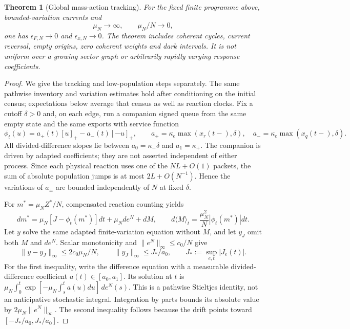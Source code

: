 \documentclass[11pt,oneside,openany]{book}
\newtheorem{theorem}{Theorem}[chapter]
\theoremstyle{definition}
\theoremstyle{remark}\newtheorem{remark}[theorem]{Remark}
\begin{document}
\begin{theorem}[Global mass-action tracking]\label{kin:tracking}
For the fixed finite programme above, bounded-variation currents and
\begin{equation}
 \mu_N\longrightarrow\infty,\qquad \mu_N/N\longrightarrow0,
 \label{kin:hierarchy}
\end{equation}
one has $\epsilon_{F,N}\to0$ and $\epsilon_{x,N}\to0$.
The theorem includes coherent cycles, current reversal, empty origins,
zero coherent weights and dark intervals. It is not uniform over a growing
sector graph or arbitrarily rapidly varying response coefficients.
\end{theorem}
\begin{proof}
We give the tracking and low-population steps separately. The same pathwise inventory and variation estimates hold after conditioning on the initial census; expectations below average that census as well as reaction clocks. Fix a cutoff
$\delta>0$ and, on each edge, run a companion signed queue from the same
empty state and the same exports with service function
\[
 \phi_t(u)=a_+(t)[u]_+-a_-(t)[-u]_+,\qquad
 a_+=\kappa_e\max(x_r(t-),\delta),\quad
 a_-=\kappa_e\max(x_q(t-),\delta).
\]
All divided-difference slopes lie between $a_0=\kappa_-\delta$ and
$a_1=\kappa_+$. The companion is driven by adapted coefficients; they are
not asserted independent of either process. Since each physical reaction
uses one of the $NL+O(1)$ packets, the sum of absolute population jumps is
at most $2L+O(N^{-1})$. Hence the variations of $a_\pm$ are bounded
independently of $N$ at fixed $\delta$.

For $m^*=\mu_NZ^*/N$, compensated reaction counting yields
\begin{equation}
 dm^*=\mu_N[J-\phi_t(m^*)]dt+\mu_Nde^N+dM,
 \qquad d\langle M\rangle_t=\frac{\mu_N^2}{N}|\phi_t(m^*)|dt.
 \label{kin:companion}
\end{equation}
Let $y$ solve the same adapted finite-variation equation without $M$, and
let $y_J$ omit both $M$ and $de^N$. Scalar monotonicity and
$\|e^N\|_\infty\le c_0/N$ give
\begin{equation}
 \|y-y_J\|_\infty\le2c_0\mu_N/N,\qquad
 \|y_J\|_\infty\le J_*/a_0,\qquad J_*:=\sup_{e,t}|J_e(t)|.
 \label{kin:dettracking}
\end{equation}
For the first inequality, write the difference equation with a measurable
divided-difference coefficient $a(t)\in[a_0,a_1]$. Its solution at $t$
is $\mu_N\int_0^t\exp[-\mu_N\int_s^t a(u)du]\,de^N(s)$.
This is a pathwise Stieltjes identity, not an anticipative stochastic
integral. Integration by parts bounds its absolute value by
$2\mu_N\|e^N\|_\infty$. The second inequality follows because the drift
points toward $[-J_*/a_0,J_*/a_0]$.


\end{proof}
\end{document}
